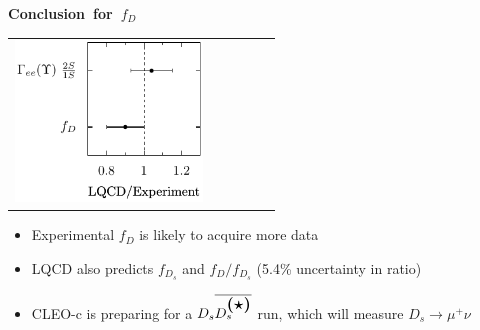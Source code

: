 \documentclass[landscape]{article}
\newenvironment{slide}[1][ ]{\mbox{\bf \boldmath #1 } \vfill}{\vfill \vspace{-1.5 cm} \mbox{ } \pagebreak}
\newenvironment{itemizer}[1]{\begin{itemize}\setlength{\itemsep}{#1}}{\end{itemize}}
\begin{document}
\begin{slide}[Conclusion for $f_D$]

\begin{center}
  \begin{tabular}{p{0.4\linewidth} p{0.13\linewidth}}
    \begin{minipage}{\linewidth}
      \includegraphics[width=\linewidth]{new_ratio_plot2}
    \end{minipage} &
  \end{tabular}
\end{center}

\vfill

\begin{itemizer}{1 cm}

  \item Experimental $f_D$ is likely to acquire more data

  \item LQCD also predicts $f_{D_s}$ and $f_D/f_{D_s}$ \hfill (5.4\% uncertainty in ratio)

  \item CLEO-c is preparing for a $D_s\overline{D^{\mbox{\large \boldmath $(\star)$}}_s}$ run, which will measure $D_s \to \mu^+ \nu$

\end{itemizer}

\end{slide}
\end{document}
